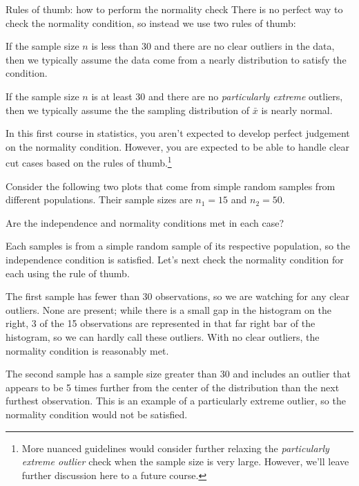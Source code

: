 \begin{onebox}{Rules of thumb:
    how to perform the normality check}
  There is no perfect way to check the normality condition,
  so instead we use two rules of thumb: %
  \begin{description}
  \setlength{\itemsep}{0mm}
  \item[$\mathbf{n < 30}$:]
      If the sample size $n$ is less than 30
      and there are no clear outliers in the data,
      then we typically assume the data come from
      a nearly distribution to satisfy the condition.
  \item[$\mathbf{n \geq 30}$:]
      If the sample size $n$ is at least 30
      and there are no \emph{particularly extreme} outliers,
      then we typically assume the the sampling distribution
      of $\bar{x}$ is nearly normal.
  \end{description}
\end{onebox}

In this first course in statistics, you aren't expected
to develop perfect judgement on the normality condition.
However, you are expected to be able to handle
clear cut cases based on the rules of thumb.\footnote{More
  nuanced guidelines would consider further relaxing
  the \emph{particularly extreme outlier} check when the
  sample size is very large.
  However, we'll leave further discussion here to a future course.}

\begin{examplewrap}
\begin{nexample}{Consider the following two plots
    that come from simple random samples from
    different populations.
    Their sample sizes are $n_1 = 15$ and $n_2 = 50$.
    \begin{center}
    \end{center}
    Are the independence and normality conditions met
    in each case?}
  \label{outliers_and_ss_condition_ex}%
  Each samples is from a simple random sample of its
  respective population, so the independence condition
  is satisfied.
  Let's next check the normality condition for
  each using the rule of thumb.
  
  The first sample has fewer than 30 observations,
  so we are watching for any clear outliers.
  None are present; while there is a small gap in the
  histogram on the right, 3 of the 15 observations
  are represented in that far right bar of the histogram,
  so we can hardly call these outliers.
  With no clear outliers, the normality condition
  is reasonably met.

  The second sample has a sample size greater than 30 and
  includes an outlier that appears to be 5 times further from the
  center of the distribution than the next furthest observation.
  This is an example of a particularly extreme outlier,
  so the normality condition would not be satisfied.
\end{nexample}
\end{examplewrap}

